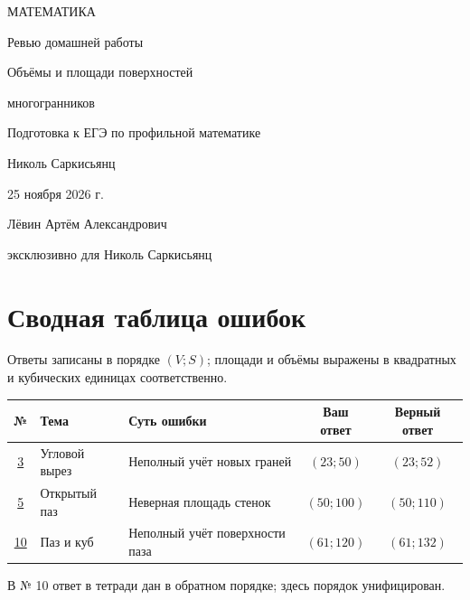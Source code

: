 \documentclass[a4paper,12pt]{article}
\begin{document}
\begin{titlepage}
\centering
\vspace*{30mm}
{\large\color{accent} МАТЕМАТИКА\par}
\vspace{15mm}
{\LARGE Ревью домашней работы\par}
\vspace{9mm}
{\Large\color{accent} Объёмы и площади поверхностей\par многогранников\par}
\vspace{18mm}
{Подготовка к ЕГЭ по профильной математике\par}
\vfill
{Николь Саркисьянц\par}
\vspace{8mm}
{25 ноября 2026 г.\par}
\vspace{16mm}
{\small Лёвин Артём Александрович\par эксклюзивно для Николь Саркисьянц\par}
\vspace{20mm}
\end{titlepage}
\section*{Сводная таблица ошибок}
Ответы записаны в порядке $(V;S)$; площади и объёмы выражены в квадратных и кубических единицах соответственно.
\begin{center}
\renewcommand{\arraystretch}{1.5}
\begin{tabularx}{\linewidth}{@{}c p{30mm} X c c@{}}
\toprule № & Тема & Суть ошибки & Ваш ответ & Верный ответ\\\midrule
\hyperref[task:3]{3} & Угловой вырез & Неполный учёт новых граней & $(23;50)$ & $(23;52)$\\
\hyperref[task:5]{5} & Открытый паз & Неверная площадь стенок & $(50;100)$ & $(50;110)$\\
\hyperref[task:10]{10} & Паз и куб & Неполный учёт поверхности паза & $(61;120)$ & $(61;132)$\\\bottomrule
\end{tabularx}
\end{center}
В № 10 ответ в тетради дан в обратном порядке; здесь порядок унифицирован.
\end{document}
